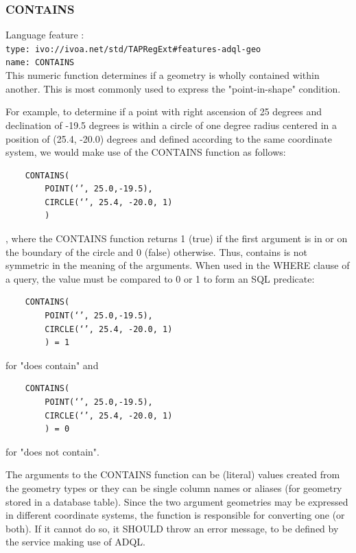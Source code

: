 \documentclass[11pt,a4paper]{ivoa}
\begin{document}
\subsubsection{CONTAINS}
\label{sec:geom.functions.contains}
{\footnotesize Language feature :}\\
{\footnotesize \verb|type: ivo://ivoa.net/std/TAPRegExt#features-adql-geo|}\\
{\footnotesize \verb|name: CONTAINS|}\\

This numeric function determines if a geometry is wholly contained within
another. This is most commonly used to express the "point-in-shape" condition.

For example, to determine if a point with right ascension of 25 degrees
and declination of -19.5 degrees is within a circle of one degree radius
centered in a position of (25.4, -20.0) degrees and defined according to the
same coordinate system, we would make use of the CONTAINS function as follows:

\begin{verbatim}
    CONTAINS(
        POINT(‘’, 25.0,-19.5),
        CIRCLE(‘’, 25.4, -20.0, 1)
        )
\end{verbatim}

, where the CONTAINS function returns 1 (true) if the first argument is in
or on the boundary of the circle and 0 (false) otherwise. Thus, contains is
not symmetric in the meaning of the arguments. When used in the WHERE clause
of a query, the value must be compared to 0 or 1 to form an SQL predicate:

\begin{verbatim}
    CONTAINS(
        POINT(‘’, 25.0,-19.5),
        CIRCLE(‘’, 25.4, -20.0, 1)
        ) = 1
\end{verbatim}

for "does contain" and

\begin{verbatim}
    CONTAINS(
        POINT(‘’, 25.0,-19.5),
        CIRCLE(‘’, 25.4, -20.0, 1)
        ) = 0
\end{verbatim}

for "does not contain".

The arguments to the CONTAINS function can be (literal) values created
from the geometry types or they can be single column names or aliases (for
geometry stored in a database table). Since the two argument geometries may
be expressed in different coordinate systems, the function is responsible
for converting one (or both). If it cannot do so, it SHOULD throw an error
message, to be defined by the service making use of ADQL.
\end{document}
